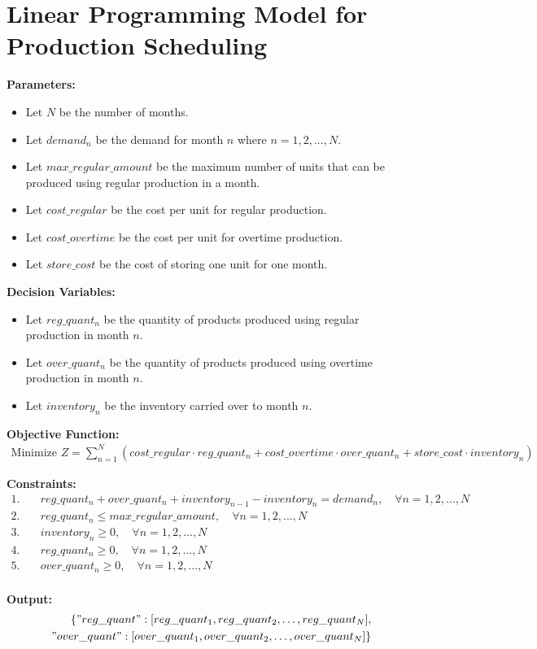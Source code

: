 \documentclass{article}
\begin{document}
\section*{Linear Programming Model for Production Scheduling}

\textbf{Parameters:}
\begin{itemize}
    \item Let $N$ be the number of months.
    \item Let $demand_n$ be the demand for month $n$ where $n = 1, 2, ..., N$.
    \item Let $max\_regular\_amount$ be the maximum number of units that can be produced using regular production in a month.
    \item Let $cost\_regular$ be the cost per unit for regular production.
    \item Let $cost\_overtime$ be the cost per unit for overtime production.
    \item Let $store\_cost$ be the cost of storing one unit for one month.
\end{itemize}

\textbf{Decision Variables:}
\begin{itemize}
    \item Let $reg\_quant_n$ be the quantity of products produced using regular production in month $n$.
    \item Let $over\_quant_n$ be the quantity of products produced using overtime production in month $n$.
    \item Let $inventory_n$ be the inventory carried over to month $n$.
\end{itemize}

\textbf{Objective Function:}
\begin{align*}
\text{Minimize } Z = \sum_{n=1}^{N} \left( cost\_regular \cdot reg\_quant_n + cost\_overtime \cdot over\_quant_n + store\_cost \cdot inventory_n \right)
\end{align*}

\textbf{Constraints:}
\begin{align*}
1. & \quad reg\_quant_n + over\_quant_n + inventory_{n-1} - inventory_n = demand_n, \quad \forall n = 1, 2, ..., N \\
2. & \quad reg\_quant_n \leq max\_regular\_amount, \quad \forall n = 1, 2, ..., N \\
3. & \quad inventory_n \geq 0, \quad \forall n = 1, 2, ..., N \\
4. & \quad reg\_quant_n \geq 0, \quad \forall n = 1, 2, ..., N \\
5. & \quad over\_quant_n \geq 0, \quad \forall n = 1, 2, ..., N \\
\end{align*}

\textbf{Output:}
\begin{align*}
\{ 
    "reg\_quant": [reg\_quant_1, reg\_quant_2, \ldots, reg\_quant_N], \\
    "over\_quant": [over\_quant_1, over\_quant_2, \ldots, over\_quant_N] 
\}
\end{align*}
\end{document}
